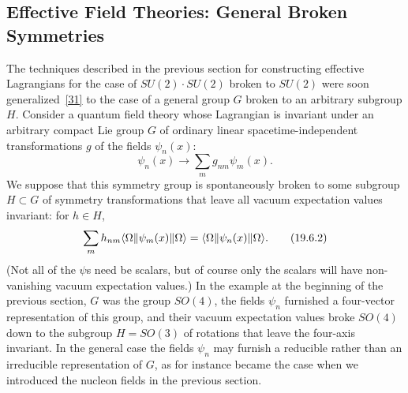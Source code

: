 
\subsection{Effective Field Theories: General Broken Symmetries}
\label{sec:19.6}

The techniques described in the previous section for constructing effective Lagrangians for the case of $SU(2)\cdot SU(2)$ broken to $SU(2)$ were soon generalized~\hyperref[ch19-ref-31]{[31]} to the case of a general group $G$ broken to an arbitrary subgroup $H$. Consider a quantum field theory whose Lagrangian is invariant under an arbitrary compact Lie group $G$ of ordinary linear spacetime-independent transformations $g$ of the fields $\psi_n(x)$:
\begin{equation}
\psi_n(x)\longrightarrow\sum_m g_{nm}\psi_m(x).
\tag{19.6.1}\label{eq:19.6.1}
\end{equation}
We suppose that this symmetry group is spontaneously broken to some subgroup $H\subset G$ of symmetry transformations that leave all vacuum expectation values invariant: for $h\in H$,
\begin{equation}
\sum_m h_{nm}\langle \Omega\rVert\psi_m(x)\lVert \Omega\rangle
=\langle \Omega\rVert\psi_n(x)\lVert \Omega\rangle.
\tag{19.6.2}\label{eq:19.6.2}
\end{equation}
(Not all of the $\psi$s need be scalars, but of course only the scalars will have non-vanishing vacuum expectation values.) In the example at the beginning of the previous section, $G$ was the group $SO(4)$, the fields $\psi_n$ furnished a four-vector representation of this group, and their vacuum expectation values broke $SO(4)$ down to the subgroup $H=SO(3)$ of rotations that leave the four-axis invariant. In the general case the fields $\psi_n$ may furnish a reducible rather than an irreducible representation of $G$, as for instance became the case when we introduced the nucleon fields in the previous section.

